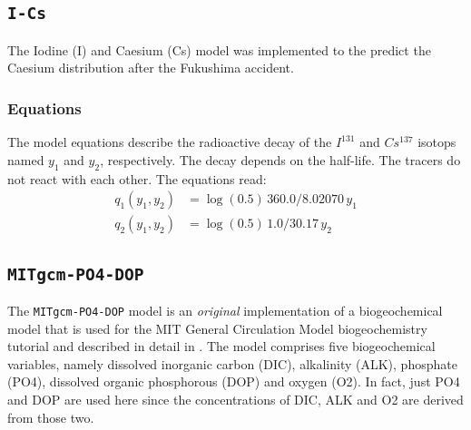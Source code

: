\documentclass{article}
\begin{document}
%
%
\subsection{\texttt{I-Cs}}

The Iodine (I) and Caesium (Cs) model was implemented to the predict
the Caesium distribution after the Fukushima accident.

%
%
\subsubsection{Equations}

The model equations describe the radioactive decay of the $I^{131}$ and $Cs^{137}$
isotops named $y_1$ and $y_2$, respectively. The decay depends on the
half-life. The tracers do not react with each other. The equations read:
\begin{align*}
q_1(y_1, y_2)	& = \log(0.5) \, 360.0 / 8.02070 \, y_1 \\
q_2(y_1, y_2)	& = \log(0.5) \, 1.0 / 30.17 \, y_2
\end{align*}

%
%
\subsection{\texttt{MITgcm-PO4-DOP}}

The \texttt{MITgcm-PO4-DOP} model is an \emph{original} implementation of
a biogeochemical model that is used for the 
MIT General Circulation Model \citep[cf.][MITgcm]{MAHPH97}
biogeochemistry tutorial and described in detail in
\citep[][]{DuSoScSt05}.
%
The model comprises five biogeochemical variables,
namely
dissolved inorganic carbon (DIC),
alkalinity (ALK),
phosphate (PO4),
dissolved organic phosphorous (DOP) and
oxygen (O2).
%
In fact,
just PO4 and DOP are used here since
the concentrations of DIC, ALK and O2 are derived from those two.

%
%
%


%
\end{document}
